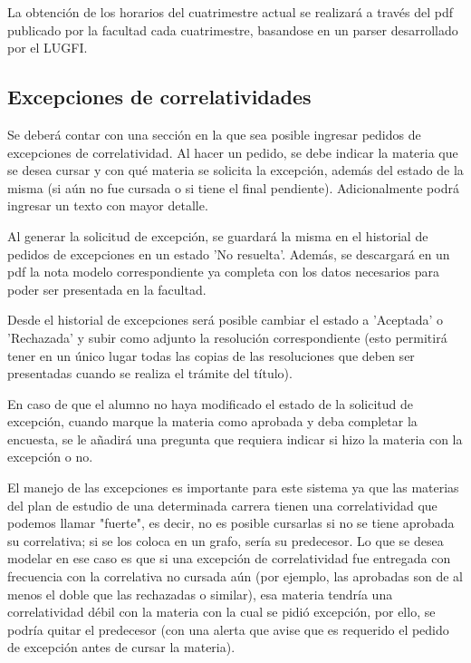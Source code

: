 \documentclass[a4paper]{article}
\begin{document}
La obtención de los horarios del cuatrimestre actual se realizará a través del pdf publicado por la facultad cada cuatrimestre, basandose en un parser desarrollado por el LUGFI\cite{PARSER_LUGFI}.

\subsection{Excepciones de correlatividades}

Se deberá contar con una sección en la que sea posible ingresar pedidos de excepciones de correlatividad. Al hacer un pedido, se debe indicar la materia que se desea cursar y con qué materia se solicita la excepción, además del estado de la misma (si aún no fue cursada o si tiene el final pendiente). Adicionalmente podrá ingresar un texto con mayor detalle.

Al generar la solicitud de excepción, se guardará la misma en el historial de pedidos de excepciones en un estado 'No resuelta'. Además, se descargará en un pdf la nota modelo correspondiente ya completa con los datos necesarios para poder ser presentada en la facultad.

Desde el historial de excepciones será posible cambiar el estado a 'Aceptada' o 'Rechazada' y subir como adjunto la resolución correspondiente (esto permitirá tener en un único lugar todas las copias de las resoluciones que deben ser presentadas cuando se realiza el trámite del título).\newline


En caso de que el alumno no haya modificado el estado de la solicitud de excepción, cuando marque la materia como aprobada y deba completar la encuesta, se le añadirá una pregunta que requiera indicar si hizo la materia con la excepción o no.\newline


El manejo de las excepciones es importante para este sistema ya que las materias del plan de estudio de una determinada carrera tienen una correlatividad que podemos llamar "fuerte", es decir, no es posible cursarlas si no se tiene aprobada su correlativa; si se los coloca en un grafo, sería su predecesor. Lo que se desea modelar en ese caso es que si una excepción de correlatividad fue entregada con frecuencia con la correlativa no cursada aún (por ejemplo, las aprobadas son de al menos el doble que las rechazadas o similar), esa materia tendría una correlatividad débil con la materia con la cual se pidió excepción, por ello, se podría quitar el predecesor (con una alerta que avise que es requerido el pedido de excepción antes de cursar la materia).\newline
\end{document}
